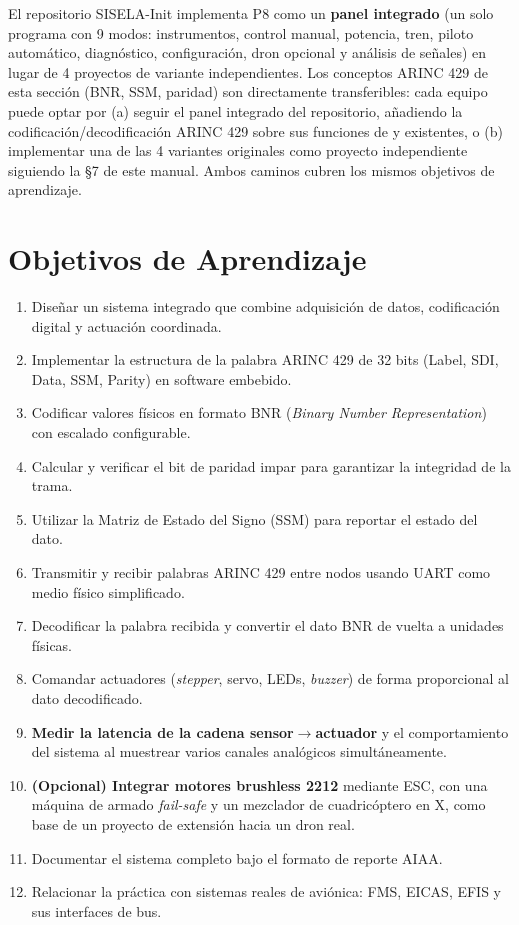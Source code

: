 \documentclass[11pt]{article}
\begin{document}
\begin{nota}
El repositorio SISELA-Init implementa P8 como un \textbf{panel integrado} (un solo
programa con 9 modos: instrumentos, control manual, potencia, tren, piloto automático,
diagnóstico, configuración, dron opcional y análisis de señales) en lugar de 4 proyectos
de variante independientes. Los conceptos ARINC 429 de esta sección (BNR, SSM, paridad)
son directamente transferibles: cada equipo puede optar por (a) seguir el panel integrado
del repositorio, añadiendo la codificación/decodificación ARINC 429 sobre sus funciones
de  y  existentes, o (b) implementar
una de las 4 variantes originales como proyecto independiente siguiendo la \S7 de este
manual. Ambos caminos cubren los mismos objetivos de aprendizaje.
\end{nota}

\section{Objetivos de Aprendizaje}
\begin{enumerate}
  \item Diseñar un sistema integrado que combine adquisición de datos, codificación
        digital y actuación coordinada.
  \item Implementar la estructura de la palabra ARINC 429 de 32 bits (Label, SDI, Data,
        SSM, Parity) en software embebido.
  \item Codificar valores físicos en formato BNR (\emph{Binary Number Representation})
        con escalado configurable.
  \item Calcular y verificar el bit de paridad impar para garantizar la integridad de la
        trama.
  \item Utilizar la Matriz de Estado del Signo (SSM) para reportar el estado del dato.
  \item Transmitir y recibir palabras ARINC 429 entre nodos usando UART como medio físico
        simplificado.
  \item Decodificar la palabra recibida y convertir el dato BNR de vuelta a unidades
        físicas.
  \item Comandar actuadores (\emph{stepper}, servo, LEDs, \emph{buzzer}) de forma
        proporcional al dato decodificado.
  \item \textbf{Medir la latencia de la cadena sensor$\to$actuador} y el comportamiento
        del sistema al muestrear varios canales analógicos simultáneamente.
  \item \textbf{(Opcional) Integrar motores brushless 2212} mediante ESC, con una
        máquina de armado \emph{fail-safe} y un mezclador de cuadricóptero en X, como
        base de un proyecto de extensión hacia un dron real.
  \item Documentar el sistema completo bajo el formato de reporte AIAA.
  \item Relacionar la práctica con sistemas reales de aviónica: FMS, EICAS, EFIS y sus
        interfaces de bus.
\end{enumerate}
\end{document}
